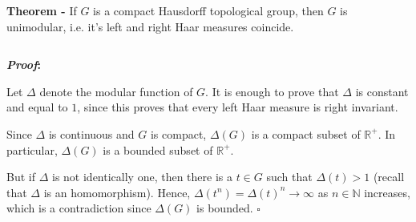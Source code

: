 \documentclass[12pt]{article}
\begin{document}
{\bf Theorem -} If $G$ is a compact Hausdorff topological group, then $G$ is unimodular, i.e. it's left and right Haar measures coincide.

$\,$

{\bf \emph{Proof}:}

Let $\Delta$ denote the modular function of $G$. It is enough to prove that $\Delta$ is constant and equal to $1$, since this proves that every left Haar measure is right invariant.

Since $\Delta$ is continuous and $G$ is compact, $\Delta(G)$ is a compact subset of $\mathbb{R}^+$. In particular, $\Delta(G)$ is a bounded subset of $\mathbb{R}^+$.

But if $\Delta$ is not identically one, then there is a $t \in G$ such that $\Delta(t) >1$ (recall that $\Delta$ is an homomorphism). Hence, $\Delta(t^n) = \Delta(t)^n \longrightarrow \infty$ as $n \in \mathbb{N}$ increases, which is a contradiction since $\Delta(G)$ is bounded. $\square$

\end{document}
